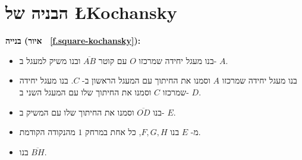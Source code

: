 


\section{הבניה של
\L{Kochansky}}\label{s.square-kochanski}

\textbf{%
בנייה (איור%
~\ref{f.square-kochansky}):}
\begin{itemize}
\item
בנו מעגל יחידה שמרכזו 
$O$
עם קוטר
$\overline{AB}$
ובנו משיק למעגל ב-%
$A$.
\item
בנו מעגל יחידה שמרכזו
$A$
וסמנו את החיתוך עם המעגל הראשון ב-%
$C$.
בנו מעגל יחידה שמרכזו 
$C$
וסמנו את החיתוך שלו עם המעגל השני ב-%
$D$. 
\item
בנו
$\overline{OD}$
וסמנו את החיתוך שלו עם המשיק ב-%
$E$.
\item
מ-%
$E$
בנו
$F,G,H$,
כל אחת במרחק 
$1$
מהנקודה הקודמת.
\item
בנו
$\overline{BH}$.
\end{itemize}

